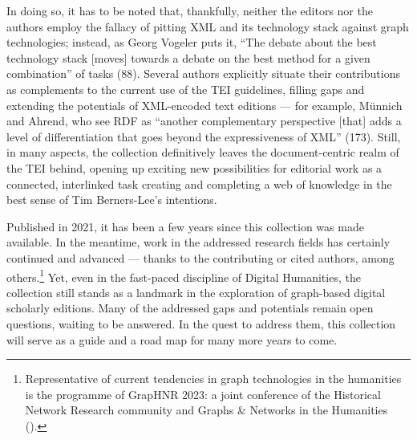 \documentclass{article}
\begin{document}
In doing so, it has to be noted that, thankfully, neither the editors
nor the authors employ the fallacy of pitting XML and its technology
stack against graph technologies; instead, as Georg Vogeler puts it,
``The debate about the best technology stack {[}moves{]} towards a
debate on the best method for a given combination'' of tasks (88).
Several authors explicitly situate their contributions as complements to
the current use of the TEI guidelines, filling gaps and extending the
potentials of XML-encoded text editions --- for example, Münnich and
Ahrend, who see RDF as ``another complementary perspective {[}that{]}
adds a level of differentiation that goes beyond the expressiveness of
XML'' (173). Still, in many aspects, the collection definitively leaves
the document-centric realm of the TEI behind, opening up exciting new
possibilities for editorial work as a connected, interlinked task
creating and completing a web of knowledge in the best sense of Tim
Berners-Lee's intentions.

Published in 2021, it has been a few years since this collection was
made available. In the meantime, work in the addressed research fields
has certainly continued and advanced --- thanks to the contributing or
cited authors, among others.\footnote{Representative of current
  tendencies in graph technologies in the humanities is the programme of
  GrapHNR 2023: a joint conference of the Historical Network Research
  community and Graphs \& Networks in the Humanities (\citeyear{historical_network_research_and_graphs__networks_in_the_humanities_graphnr_2023}).} Yet, even in the fast-paced discipline
of Digital Humanities, the collection still stands as a landmark in the
exploration of graph-based digital scholarly editions. Many of the
addressed gaps and potentials remain open questions, waiting to be
answered. In the quest to address them, this collection will serve as a
guide and a road map for many more years to come.

\vspace{4em}

\begin{flushleft}
    \renewcommand*{\mkbibnamefamily}[1]{\textsc{#1}}
    \renewcommand*{\mkbibnamegiven}[1]{\textsc{#1}} 
\printbibliography
\end{flushleft}
\end{document}
